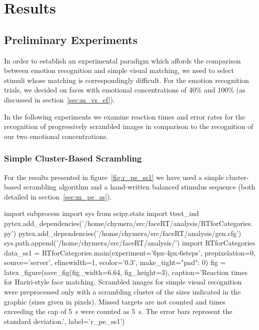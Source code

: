 \chapter{Results}
    \section{Preliminary Experiments}\label{sec:r_pe}
	In order to establish an experimental paradigm which affords the comparison between emotion recognition and simple visual matching, we need to select stimuli whose matching is correspondingly difficult.
	For the emotion recognition trials, we decided on faces with emotional concentrations of 40\% and 100\% (as discussed in section~\ref{sec:m_vs_ef}).
	
	In the following experiments we examine reaction times and error rates for the recognition of progressively scrambled images in comparison to the recognition of our two emotional concentrations.
	\subsection{Simple Cluster-Based Scrambling}\label{sec:r_pe_ss}
	    For the results presented in figure~\ref{fig:r_pe_ss1} we have used a simple cluster-based scrambling algorithm and a hand-written balanced stimulus sequence 
	    (both detailed in section~\ref{sec:m_pe_ss}).
	    \begin{pycode}
		import subprocess
		import sys
		from scipy.stats import ttest_ind
		pytex.add_dependencies('/home/chymera/src/faceRT/analysis/RTforCategories.py')
		pytex.add_dependencies('/home/chymera/src/faceRT/analysis/gen.cfg')
		sys.path.append('/home/chymera/src/faceRT/analysis/')
		import RTforCategories
		data_ss1 = RTforCategories.main(experiment='6px-4px-6steps', prepixelation=0, source='server', elinewidth=1, ecolor='0.3', make_tight={"pad": 0})
		fig = latex_figure(save_fig(fig_width=6.64, fig_height=3), caption='Reaction times for Hariri-style face matching. Scrambled images for simple visual recognition were preprocessed only with a scrambling cluster of the sizes indicated in the graphic (sizes given in pixels). Missed targets are not counted and times exceeding the cap of \SI{5}{\second} were counted as \SI{5}{\second}. The error bars represent the standard deviation.', label='r_pe_ss1')
	    \end{pycode}
	    
